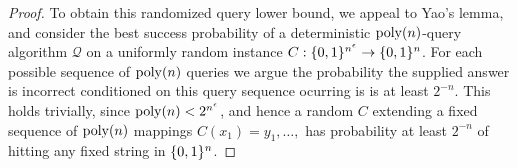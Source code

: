 \begin{proof}
To obtain this randomized query lower bound, we appeal to Yao's lemma, and consider the best success probability of a deterministic $\mathrm{poly}(n)$-query algorithm $\mathcal{Q}$ on a uniformly random instance $C: \{0,1\}^{n^\epsilon} \to \{0,1\}^n$. For each possible sequence of $\mathrm{poly}(n)$ queries we argue the probability the supplied answer is incorrect conditioned on this query sequence ocurring is is at least $2^{-n}$. This holds trivially, since $\mathrm{poly}(n) < 2^{n^\epsilon}$, and hence a random $C$ extending a fixed sequence of $\mathrm{poly}(n)$ mappings $C(x_1) = y_1,\ldots, $ has probability at least $2^{-n}$ of hitting any fixed string in $\{0,1\}^n$.
\end{proof}


